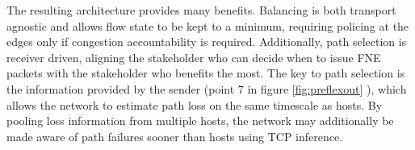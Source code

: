 The resulting architecture provides many benefits. 
Balancing is both transport agnostic and allows flow state to be kept to a minimum, requiring policing at the edges only if congestion accountability is required. 
Additionally, path selection is receiver driven, aligning the stakeholder who can decide when to issue \ac{FNE} packets with the stakeholder who benefits the most. 
The key to path selection is the information provided by the sender (point 7 in figure \ref{fig:preflexout} ), which allows the network to estimate path loss on the same timescale as hosts. 
By pooling loss information from multiple hosts, the network may additionally be made aware of path failures sooner than hosts using \ac{TCP} inference.


